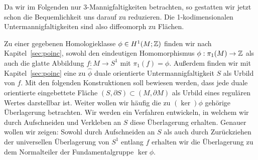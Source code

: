 Da wir im Folgenden nur 3-Mannigfaltigkeiten betrachten, so gestatten wir jetzt schon die Bequemlichkeit uns darauf zu reduzieren. Die 1-kodimensionalen Untermannigfaltigkeiten sind also diffeomorph zu Flächen.

\label{sec:constr}
Zu einer gegebenen Homologieklasse $  \phi \in H^1(M;\mathbb{Z})$ finden wir nach Kapitel~\ref{sec:poinc}, sowohl den eindeutigen Homomorphismus $\phi:\pi_1(M) \to \mathbb{Z}$ als auch die glatte Abbildung $f:M \to S^1$ mit $\pi_1(f)=\phi$. Außerdem finden wir mit Kapitel~\ref{sec:poinc} eine zu $\hat \phi$ duale orientierte Untermannigfaltigkeit $S$ als Urbild von $f$. Mit den folgenden Konstruktionen soll bewiesen werden, dass jede duale orientierte eingebettete Fläche $(S,\partial S) \subset (M,\partial M)$ als Urbild eines regulären Wertes darstellbar ist. Weiter wollen wir häufig die zu $(\ker) \phi$ gehörige Überlagerung betrachten. Wir werden ein Verfahren entwickeln, in welchem wir durch Aufschneiden und Verkleben an $S$ diese Überlagerung erhalten. Genauer wollen wir zeigen: Sowohl durch Aufschneiden an $S$ als auch durch Zurückziehen der universellen Überlagerung von $S^1$ entlang $f$ erhalten wir die Überlagerung zu dem Normalteiler der Fundamentalgruppe $\ker\phi$.

